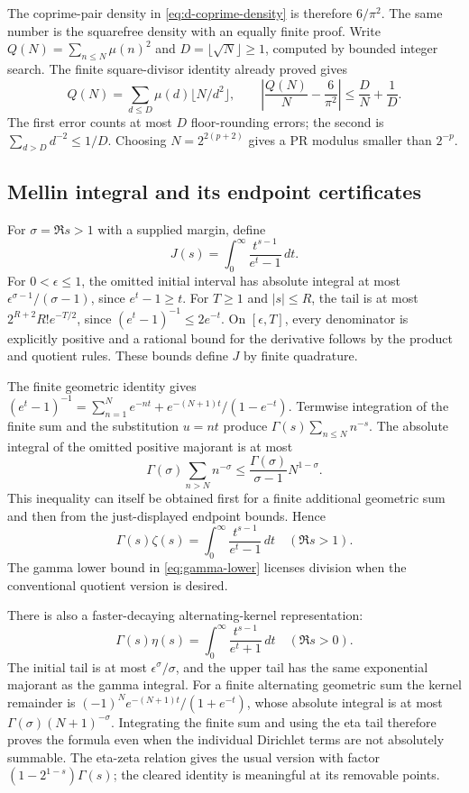 The coprime-pair density in \eqref{eq:d-coprime-density} is therefore
$6/\pi^2$. The same number is the squarefree density with an equally
finite proof. Write $Q(N)=\sum_{n\le N}\mu(n)^2$ and
$D=\lfloor\sqrt N\rfloor\ge1$, computed by bounded integer search.
The finite square-divisor identity already proved gives
\[
 Q(N)=\sum_{d\le D}\mu(d)\lfloor N/d^2\rfloor,\qquad
 \left|\frac{Q(N)}N-\frac6{\pi^2}\right|
       \le\frac DN+\frac1D.
\]
The first error counts at most $D$ floor-rounding errors; the second is
$\sum_{d>D}d^{-2}\le1/D$. Choosing $N=2^{2(p+2)}$ gives a PR
modulus smaller than $2^{-p}$.

\subsection{Mellin integral and its endpoint certificates}
\label{subsec:mellin}
For $\sigma=\Re s>1$ with a supplied margin, define
\[
 J(s)=\int_0^\infty\frac{t^{s-1}}{e^t-1}\,dt.
\]
For $0<\epsilon\le1$, the omitted initial interval has absolute integral
at most $\epsilon^{\sigma-1}/(\sigma-1)$, since $e^t-1\ge t$.
For $T\ge1$ and $|s|\le R$, the tail is at most
$2^{R+2}R!e^{-T/2}$, since $(e^t-1)^{-1}\le2e^{-t}$.
On $[\epsilon,T]$, every denominator is explicitly positive and a
rational bound for the derivative follows by the product and quotient
rules. These bounds define $J$ by finite quadrature.

The finite geometric identity gives
$(e^t-1)^{-1}=\sum_{n=1}^Ne^{-nt}+e^{-(N+1)t}/(1-e^{-t})$.
Termwise integration of the finite sum and the substitution $u=nt$
produce $\Gamma(s)\sum_{n\le N}n^{-s}$.
The absolute integral of the omitted positive majorant is at most
\[
 \Gamma(\sigma)\sum_{n>N}n^{-\sigma}
       \le\frac{\Gamma(\sigma)}{\sigma-1}N^{1-\sigma}.
\]
This inequality can itself be obtained first for a finite additional
geometric sum and then from the just-displayed endpoint bounds.
Hence
\begin{equation}
 \boxed{\displaystyle
 \Gamma(s)\zeta(s)=\int_0^\infty\frac{t^{s-1}}{e^t-1}\,dt
                     \quad(\Re s>1).}
 \label{eq:zeta-mellin}
\end{equation}
The gamma lower bound in \eqref{eq:gamma-lower} licenses division when
the conventional quotient version is desired.

There is also a faster-decaying alternating-kernel representation:
\[
 \boxed{\displaystyle
 \Gamma(s)\eta(s)=\int_0^\infty\frac{t^{s-1}}{e^t+1}\,dt
                     \quad(\Re s>0).}
\]
The initial tail is at most $\epsilon^\sigma/\sigma$, and the upper
tail has the same exponential majorant as the gamma integral.
For a finite alternating geometric sum the kernel remainder is
$(-1)^Ne^{-(N+1)t}/(1+e^{-t})$, whose absolute integral is at most
$\Gamma(\sigma)(N+1)^{-\sigma}$. Integrating the finite sum and
using the eta tail therefore proves the formula even when the individual
Dirichlet terms are not absolutely summable. The eta-zeta relation gives
the usual version with factor $(1-2^{1-s})\Gamma(s)$; the cleared
identity is meaningful at its removable points.

